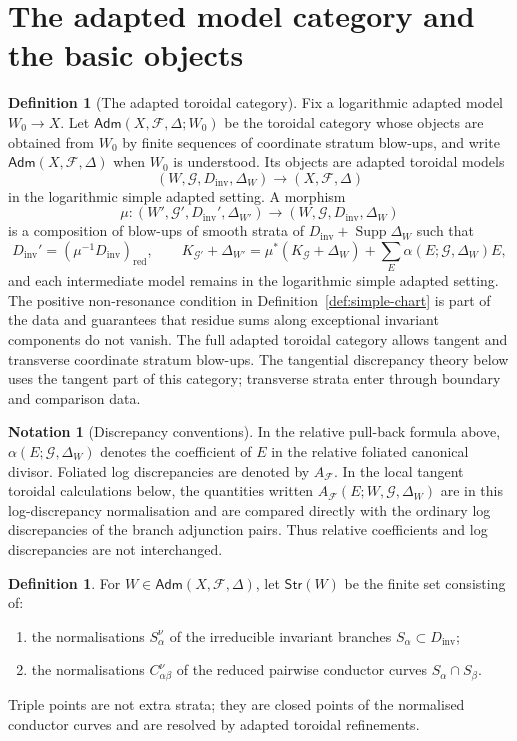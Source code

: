 \documentclass[11pt]{amsart}
\numberwithin{equation}{section}
\theoremstyle{plain}
\theoremstyle{definition}
\newtheorem{Definition}[Theorem]{Definition}
\newtheorem{Notation}[Theorem]{Notation}
\newcommand{\Supp}{\operatorname{Supp}}
\newcommand{\Adm}{\mathsf{Adm}}
\newcommand{\red}{\mathrm{red}}
\newcommand{\Strata}{\mathsf{Str}}
\newcommand{\AF}{A_{\mathcal F}}
\newcommand{\Dinv}{D_{\mathrm{inv}}}
\newcommand{\cF}{\mathcal F}
\newcommand{\cG}{\mathcal G}
\begin{document}
\section{The adapted model category and the basic objects}
\label{sec:category}



\begin{Definition}[The adapted toroidal category]
Fix a logarithmic adapted model $W_0\to X$. Let $\Adm(X,\cF,\Delta;W_0)$ be the toroidal category whose objects are obtained from $W_0$ by finite sequences of coordinate stratum blow-ups, and write $\Adm(X,\cF,\Delta)$ when $W_0$ is understood. Its objects are adapted toroidal models
\[
(W,\cG,\Dinv,\Delta_W)\to (X,\cF,\Delta)
\]
in the logarithmic simple adapted setting.  A morphism
\[
\mu:(W',\cG',\Dinv',\Delta_{W'})\longrightarrow (W,\cG,\Dinv,\Delta_W)
\]
is a composition of blow-ups of smooth strata of $\Dinv+\Supp\Delta_W$ such that
\[
\Dinv'=(\mu^{-1}\Dinv)_{\red},
\qquad
K_{\cG'}+\Delta_{W'}=\mu^*(K_{\cG}+\Delta_W)+\sum_E \alpha(E;\cG,\Delta_W)E,
\]
and each intermediate model remains in the logarithmic simple adapted setting.  The positive non-resonance condition in Definition~\ref{def:simple-chart} is part of the data and guarantees that residue sums along exceptional invariant components do not vanish.
The full adapted toroidal category allows tangent and transverse coordinate
stratum blow-ups.  The tangential discrepancy theory below uses the tangent
part of this category; transverse strata enter through boundary and comparison
data.
\end{Definition}


\begin{Notation}[Discrepancy conventions]
In the relative pull-back formula above, \(\alpha(E;\cG,\Delta_W)\) denotes
the coefficient of \(E\) in the relative foliated canonical divisor.  Foliated
log discrepancies are denoted by \(\AF\).  In the local tangent toroidal
calculations below, the quantities written \(\AF(E;W,\cG,\Delta_W)\) are in
this log-discrepancy normalisation and are compared directly with the ordinary
log discrepancies of the branch adjunction pairs.  Thus relative coefficients
and log discrepancies are not interchanged.
\end{Notation}


\begin{Definition}
For $W\in\Adm(X,\cF,\Delta)$, let $\Strata(W)$ be the finite set consisting of:
\begin{enumerate}[label=\textup{(\roman*)},leftmargin=2.4em]
\item the normalisations $S_\alpha^\nu$ of the irreducible invariant branches $S_\alpha\subset \Dinv$;
\item the normalisations $C_{\alpha\beta}^\nu$ of the reduced pairwise conductor curves $S_\alpha\cap S_\beta$.
\end{enumerate}
Triple points are not extra strata; they are closed points of the normalised conductor curves and are resolved by adapted toroidal refinements.
\end{Definition}
\end{document}
